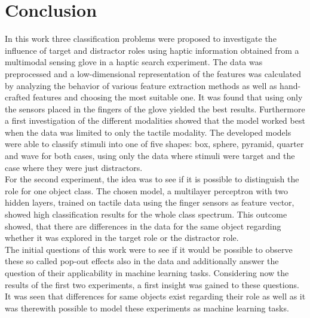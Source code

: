 
\chapter{Conclusion} %

\label{Conclusion} %
In this work three classification problems were proposed to investigate the influence of target and distractor roles using haptic information obtained from a multimodal sensing glove in a haptic search experiment. The data was preprocessed and a low-dimensional representation of the features was calculated by analyzing the behavior of various feature extraction methods as well as hand-crafted features and choosing the most suitable one. It was found that using only the sensors placed in the fingers of the glove yielded the best results. Furthermore a first investigation of the different modalities showed that the model worked best when the data was limited to only the tactile modality. The developed models were able to classify stimuli into one of five shapes: box, sphere, pyramid, quarter and wave for both cases, using only the data where stimuli were target and the case where they were just distractors. \\
For the second experiment, the idea was to see if it is possible to distinguish the role for one object class. The chosen model, a multilayer perceptron with two hidden layers, trained on tactile data using the finger sensors as feature vector, showed high classification results for the whole class spectrum. This outcome showed, that there are differences in the data for the same object regarding whether it was explored in the target role or the distractor role. \\
The initial questions of this work were to see if it would be possible to observe these so called pop-out effects also in the data and additionally answer the question of their applicability in machine learning tasks. Considering now the results of the first two experiments, a first insight was gained to these questions. It was seen that differences for same objects exist regarding their role as well as it was therewith possible to model these experiments as machine learning tasks.\\
